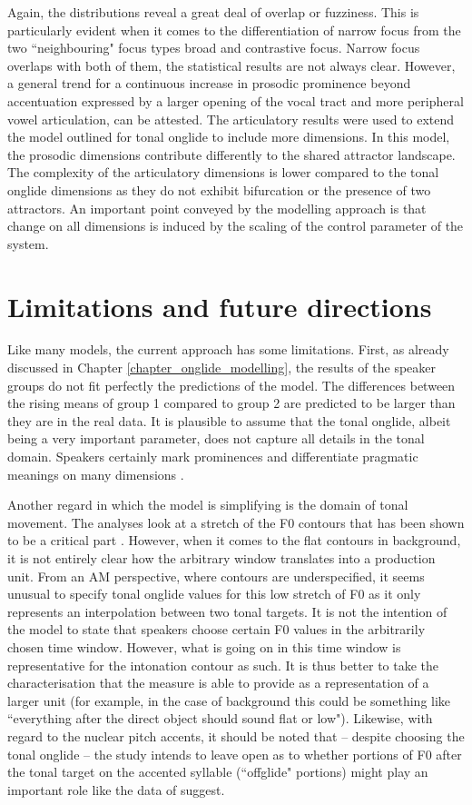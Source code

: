Again, the distributions reveal a great deal of overlap or fuzziness. This is particularly evident when it comes to the differentiation of narrow focus from the two ``neighbouring" focus types broad and contrastive focus. Narrow focus overlaps with both of them, the statistical results are not always clear. However, a general trend for a continuous increase in prosodic prominence beyond accentuation expressed by a larger opening of the vocal tract and more peripheral vowel articulation, can be attested. The articulatory results were used to extend the model outlined for tonal onglide to include more dimensions. In this model, the prosodic dimensions contribute differently to the shared attractor landscape. The complexity of the articulatory dimensions is lower compared to the tonal onglide dimensions as they do not exhibit bifurcation or the presence of two attractors. An important point conveyed by the modelling approach is that change on all dimensions is induced by the scaling of the control parameter of the system. 

\section{Limitations and future directions}

Like many models, the current approach has some limitations. First, as already discussed in Chapter \ref{chapter_onglide_modelling}, the results of the speaker groups do not fit perfectly the predictions of the model. The differences between the rising means of group 1 compared to group 2 are predicted to be larger than they are in the real data. It is plausible to assume that the tonal onglide, albeit being a very important parameter, does not capture all details in the tonal domain. Speakers certainly mark prominences and differentiate pragmatic meanings on many dimensions \citep{BaumannWinter2018}.

Another regard in which the model is simplifying is the domain of tonal movement. The analyses look at a stretch of the F0 contours that has been shown to be a critical part \citep{RitterGrice2015, BaumannRöhr2015}. However, when it comes to the flat contours in background, it is not entirely clear how the arbitrary window translates into a production unit. From an AM perspective, where contours are underspecified, it seems unusual to specify tonal onglide values for this low stretch of F0 as it only represents an interpolation between two tonal targets. It is not the intention of the model to state that speakers choose certain F0 values in the arbitrarily chosen time window. However, what is going on in this time window is representative for the intonation contour as such. It is thus better to take the characterisation that the measure is able to provide as a representation of a larger unit (for example, in the case of background this could be something like ``everything after the direct object should sound flat or low"). Likewise, with regard to the nuclear pitch accents, it should be noted that -- despite choosing the tonal onglide -- the study intends to leave open as to whether portions of F0 after the tonal target on the accented syllable (``offglide" portions) might play an important role like the data of \citet{KüglerGollrad2015} suggest.

